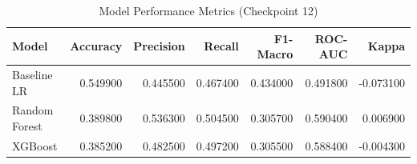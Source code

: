 \begin{table}
\caption{Model Performance Metrics (Checkpoint 12)}
\label{tab:metrics}
\begin{tabular}{lrrrrrr}
\toprule
Model & Accuracy & Precision & Recall & F1-Macro & ROC-AUC & Kappa \\
\midrule
Baseline LR & 0.549900 & 0.445500 & 0.467400 & 0.434000 & 0.491800 & -0.073100 \\
Random Forest & 0.389800 & 0.536300 & 0.504500 & 0.305700 & 0.590400 & 0.006900 \\
XGBoost & 0.385200 & 0.482500 & 0.497200 & 0.305500 & 0.588400 & -0.004300 \\
\bottomrule
\end{tabular}
\end{table}
